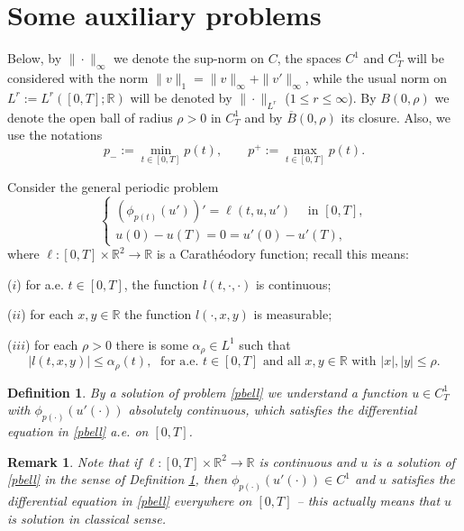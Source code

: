 \documentclass[11pt]{amsart}
\newtheorem{definition}[theorem]{Definition}
\newtheorem{remark}[theorem]{Remark}
\numberwithin{equation}{section} \textwidth=15.5cm
\begin{document}
\section{Some auxiliary problems}\label{sectiunea2bis}

Below, by $\| \cdot \| _{\infty}$ we denote the sup-norm on $C$, the spaces $C^1$ and $C_T^1$ will be considered with the norm
$\|v\|_1=\|v\|_\infty+\|v'\|_\infty$, while the usual norm on $L^r:=L^r([0,T]; \mathbb{R})$ will be denoted by $\| \cdot \|_{L^r}$ ($1\leq r \leq \infty$). By $B(0,\rho)$ we denote the open ball of radius $\rho>0$ in $C_T^1$ and by $\overline B(0,\rho)$ its closure. Also, we use the notations $$p_-:=\min_{t\in[0,T]} p(t), \qquad p^+:=\max_{t\in[0,T]} p(t).$$

Consider the general periodic problem
\begin{equation}\label{pbell}
	\left \{
            \begin{array}{ll}
		      (\phi_{p(t)}(u'))'=\ell(t,u,u')\quad \mbox{ in }[0,T],\\
		      u(0)-u(T)=0=u'(0)-u'(T),
			\end{array}
    \right.
\end{equation}
where $\ell:[0,T]\times\mathbb{R}^2\to\mathbb{R}$ is a Carath\'{e}odory function; recall this means:
\smallskip

($i$) for a.e. $t\in [0,T]$, the function $l(t, \cdot, \cdot )$ is continuous;
\smallskip

($ii$) for each $x,y \in \mathbb{R}$ the function $l( \cdot,x,y)$ is measurable;
\smallskip

($iii$) for each $\rho >0$ there is some $\alpha_{\rho} \in L^1$ such that
$$|l(t,x,y)| \leq \alpha_{\rho}(t), \; \mbox{ for a.e. }t\in [0,T] \mbox{ and all }x,y \in \mathbb{R} \mbox{ with }|x|, |y| \leq \rho.$$

\begin{definition}\label{def1}\emph{By a {\it solution} of problem \eqref{pbell} we understand a function $u\in C^1_T$ with $\phi_{p(\cdot )}(u'( \cdot ))$ absolutely continuous, which satisfies the differential equation in \eqref{pbell} a.e. on $[0,T]$.
}
\end{definition}

\begin{remark}\label{remark1} \emph{Note that if $\ell:[0,T]\times\mathbb{R}^2\to\mathbb{R}$ is continuous and $u$ is a solution  of \eqref{pbell} in the sense of Definition \ref{def1}, then $\phi_{p(\cdot )}(u'( \cdot ))\in C^1$ and $u$ satisfies the differential equation in \eqref{pbell} everywhere on $[0,T]$ -- this actually means that $u$ is solution in classical sense.}
\end{remark}
\smallskip
\end{document}
